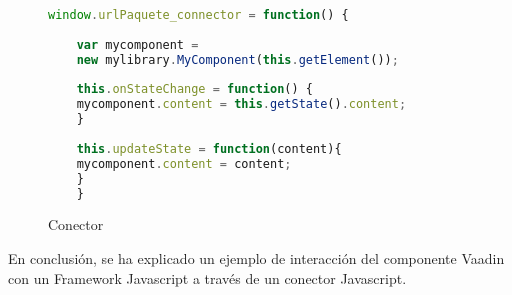 \begin{figure}[!tb]
	\centering
	\begin{lstlisting}[language=JavaScript]
	window.urlPaquete_connector = function() {
	
	var mycomponent = 
	new mylibrary.MyComponent(this.getElement());
	
	this.onStateChange = function() {
	mycomponent.content = this.getState().content;
	}
	
	this.updateState = function(content){
	mycomponent.content = content;
	}
	}
	\end{lstlisting}
	\caption{Conector}
	\label{fig:conectorDesc}
\end{figure}

En conclusión, se ha explicado un ejemplo de interacción del componente Vaadin con un Framework Javascript a través de un conector Javascript.